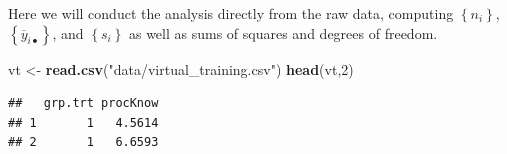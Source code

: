 \documentclass[
]{book}
\newenvironment{Shaded}{\begin{snugshade}}{\end{snugshade}}
\newcommand{\DecValTok}[1]{\textcolor[rgb]{0.00,0.00,0.81}{#1}}
\newcommand{\FunctionTok}[1]{\textcolor[rgb]{0.13,0.29,0.53}{\textbf{#1}}}
\newcommand{\NormalTok}[1]{#1}
\newcommand{\OtherTok}[1]{\textcolor[rgb]{0.56,0.35,0.01}{#1}}
\newcommand{\StringTok}[1]{\textcolor[rgb]{0.31,0.60,0.02}{#1}}
\begin{document}
Here we will conduct the analysis directly from the raw data, computing
\(\left\{n_i\right\}\), \(\left\{\overline{y}_{i\bullet}\right\}\), and
\(\left\{s_i\right\}\) as well as sums of squares and degrees of
freedom.

\begin{Shaded}
\begin{Highlighting}[]
\NormalTok{vt }\OtherTok{\textless{}{-}} \FunctionTok{read.csv}\NormalTok{(}\StringTok{"data/virtual\_training.csv"}\NormalTok{)}
\FunctionTok{head}\NormalTok{(vt,}\DecValTok{2}\NormalTok{)}
\end{Highlighting}
\end{Shaded}

\begin{verbatim}
##   grp.trt procKnow
## 1       1   4.5614
## 2       1   6.6593
\end{verbatim}
\end{document}
